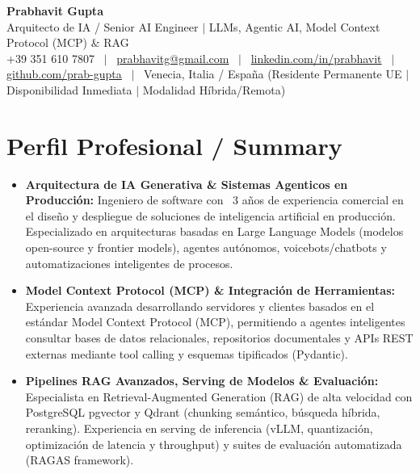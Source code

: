 \documentclass[a4paper,10pt]{article}
\begin{document}
\begin{minipage}[c]{0.80\textwidth}
  {\Huge\bfseries Prabhavit Gupta}\\[3pt]
  {\color{accent}\large Arquitecto de IA / Senior AI Engineer $\vert$ LLMs, Agentic AI, Model Context Protocol (MCP) $\&$ RAG}\\[6pt]
  {\footnotesize +39 351 610 7807 ~$\vert$~
  \href{mailto:prabhavitg@gmail.com}{prabhavitg@gmail.com} ~$\vert$~
  \href{https://www.linkedin.com/in/prabhavit/}{linkedin.com/in/prabhavit} ~$\vert$~
  \href{https://github.com/prab-gupta}{github.com/prab-gupta} ~$\vert$~
  Venecia, Italia / España (Residente Permanente UE $\vert$ Disponibilidad Inmediata $\vert$ Modalidad Híbrida/Remota)}
\end{minipage}\hfill

\vspace{6pt}

\section{Perfil Profesional / Summary}
\begin{itemize}
  \item \textbf{Arquitectura de IA Generativa \& Sistemas Agenticos en Producción:} Ingeniero de software con ~3 años de experiencia comercial en el diseño y despliegue de soluciones de inteligencia artificial en producción. Especializado en arquitecturas basadas en Large Language Models (modelos open-source y frontier models), agentes autónomos, voicebots/chatbots y automatizaciones inteligentes de procesos.
  \item \textbf{Model Context Protocol (MCP) \& Integración de Herramientas:} Experiencia avanzada desarrollando servidores y clientes basados en el estándar Model Context Protocol (MCP), permitiendo a agentes inteligentes consultar bases de datos relacionales, repositorios documentales y APIs REST externas mediante tool calling y esquemas tipificados (Pydantic).
  \item \textbf{Pipelines RAG Avanzados, Serving de Modelos \& Evaluación:} Especialista en Retrieval-Augmented Generation (RAG) de alta velocidad con PostgreSQL pgvector y Qdrant (chunking semántico, búsqueda híbrida, reranking). Experiencia en serving de inferencia (vLLM, quantización, optimización de latencia y throughput) y suites de evaluación automatizada (RAGAS framework).
\end{itemize}
\end{document}
